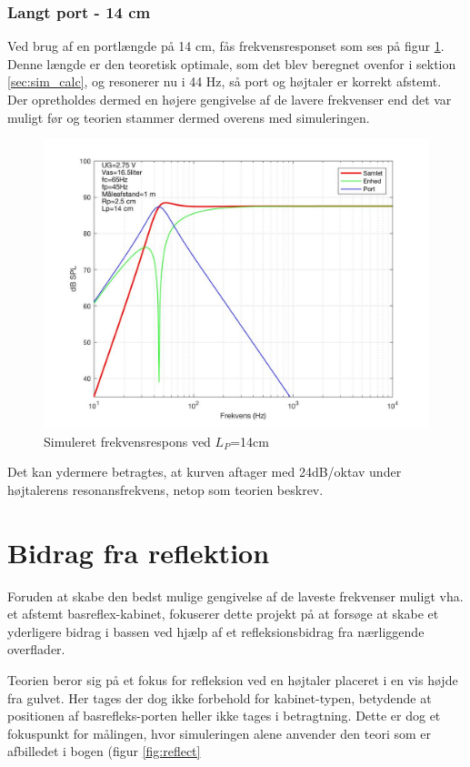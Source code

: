 \subsubsection{Langt port - 14 cm}

Ved brug af en portlængde på 14 cm, fås frekvensresponset som ses på figur \ref{fig:sim_langt}. \\
Denne længde er den teoretisk optimale, som det blev beregnet ovenfor i sektion \ref{sec:sim_calc}, og resonerer nu i 44 Hz, så port og højtaler er korrekt afstemt. 
Der opretholdes dermed en højere gengivelse af de lavere frekvenser end det var muligt før og teorien stammer dermed overens med simuleringen. 

\begin{figure}[h!]
	\centering
	\includegraphics[width=.75\textwidth]{Pics/sim_lang}
	\caption{Simuleret frekvensrespons ved $L_P$=14cm } 
	\label{fig:sim_langt}
\end{figure}

Det kan ydermere betragtes, at kurven aftager med 24dB/oktav under højtalerens resonansfrekvens, netop som teorien beskrev.\cite{Elektroakustik}

\section{Bidrag fra reflektion}
\label{sec:reflection}
Foruden at skabe den bedst mulige gengivelse af de laveste frekvenser muligt vha. et afstemt basreflex-kabinet, fokuserer dette projekt på at forsøge at skabe et yderligere bidrag i bassen ved hjælp af et refleksionsbidrag fra nærliggende overflader. 

Teorien beror sig på et fokus for refleksion ved en højtaler placeret i en vis højde fra gulvet. Her tages der dog ikke forbehold for kabinet-typen, betydende at positionen af basrefleks-porten heller ikke tages i betragtning. 
Dette er dog et fokuspunkt for målingen, hvor simuleringen alene anvender den teori som er afbilledet i bogen (figur \ref{fig:reflect}
\cite{Elektroakustik}


